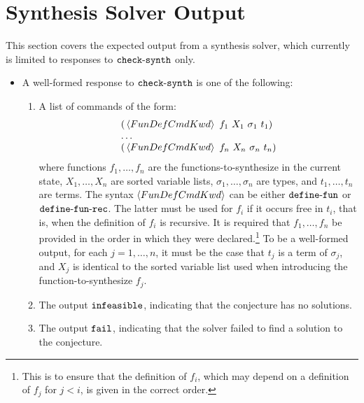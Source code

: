 \documentclass[english,a4paper,10pt]{article}
\begin{document}
\section{Synthesis Solver Output}
\label{sec:output}

This section covers the expected output from a synthesis solver,
which currently is limited to responses to ${\tt check\mbox{-}synth}$ 
only.

\begin{itemize}
\item
A well-formed response to ${\tt check\mbox{-}synth}$ is one of the following:

\begin{enumerate}
\item
A list of commands of the form:
\[
\begin{array}{l}
{\tt (}\left\langle FunDefCmdKwd\right\rangle\mbox{ }f_{1}\mbox{ }X_{1}\mbox{ }\sigma_{1}\mbox{ }t_{1}{\tt )}\\
\ldots\\
{\tt (}\left\langle FunDefCmdKwd\right\rangle\mbox{ }f_{n}\mbox{ }X_{n}\mbox{ }\sigma_{n}\mbox{ }t_{n}{\tt )}
\end{array}
\]
where functions $f_{1}, \ldots, f_{n}$
are the functions-to-synthesize in the current state,
$X_{1}, \ldots, X_{n}$ are sorted variable lists,
$\sigma_{1}, \ldots, \sigma_{n}$ are types,
and $t_{1}, \ldots, t_{n}$ are terms.
The syntax $\left\langle FunDefCmdKwd\right\rangle$ can be either ${\tt define\mbox{-}fun}$ or ${\tt define\mbox{-}fun\mbox{-}rec}$.
The latter must be used for $f_i$ if it occurs free in $t_i$,
that is, when the definition of $f_i$ is recursive.
It is required that $f_1, \ldots, f_n$ be
provided in the order in which they were declared.\footnote{
This is to ensure that the definition of $f_i$, which may depend on a definition
of $f_j$ for $j<i$, is given in the correct order.
}
To be a well-formed output, 
for each $j=1, \ldots, n$, it must be the case that
$t_{j}$ is a term of $\sigma_{j}$,
and $X_{j}$ is identical to the sorted variable list
used when introducing the function-to-synthesize $f_{j}$.

\item
The output ${\tt infeasible}$,
indicating that the conjecture has no solutions.

\item
The output ${\tt fail}$,
indicating that the solver failed to find a solution to the conjecture.

\end{enumerate}


\end{itemize}
\end{document}
